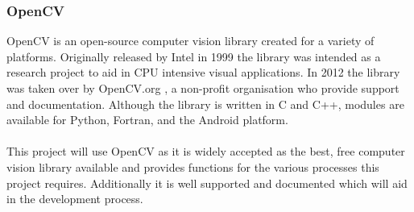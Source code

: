 	\subsubsection{OpenCV}
		OpenCV is an open-source computer vision library created for a variety of platforms. Originally released by Intel in 1999 \citep{bradski2008opencv} the library was intended as a research project to aid in CPU intensive visual applications. In 2012 the library was taken over by OpenCV.org \citep{opencvsite}, a non-profit organisation who provide support and documentation. Although the library is written in C and C++, modules are available for Python, Fortran, and the Android platform.
		\\\\
		This project will use OpenCV as it is widely accepted as the best, free computer vision library available and provides functions for the various processes this project requires. Additionally it is well supported and documented which will aid in the development process.
